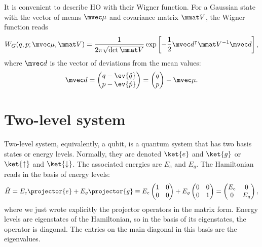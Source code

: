 \documentclass[fontsize=9pt,bookmarkpackage=false]{scrartcl}
\begin{document}
It is convenient to describe HO with their Wigner function.
For a Gaussian state with the vector of means $\mvec \mu$ and covariance matrix $\mmat V$, the Wigner function reads
\begin{equation}
  W_G ( q , p ; \mvec \mu, \mmat V )
  =
  \frac{ 1 }{ 2 \pi \sqrt{ \det \mmat V }}
  \exp\left[
    - \frac 12 \mvec d^\intercal \mmat V^{-1}  \mvec d
  \right],
\end{equation}
where $\mvec d$ is the vector of deviations from the mean values:
\begin{equation}
  \mvec d
  =
  \begin{pmatrix}
    q - \ev{ \hat q } \\ p - \ev{ \hat p }
  \end{pmatrix}
  =
  \begin{pmatrix}
    q \\ p
  \end{pmatrix}- \mvec \mu.
\end{equation}

\section{Two-level system} %
\label{sec:two_level_system}

Two-level system, equivalently, a qubit, is a quantum system that has two basis states or energy levels.
Normally, they are denoted $\ket{e}$ and $\ket{g}$ or $\ket{\uparrow}$ and $\ket{\downarrow}$.
The associated energies are $E_e$ and $E_g$.
The Hamiltonian reads in the basis of energy levels:
\begin{equation}
  \hat H = E_e \projector{e} + E_g \projector{g}
  \equiv
  E_e
  \begin{pmatrix}
    1 & 0 \\ 0 & 0
  \end{pmatrix}
  +
  E_g
  \begin{pmatrix}
    0 & 0 \\ 0 & 1
  \end{pmatrix}
  =
  \begin{pmatrix}
    E_e & 0 \\ 0 & E_g
  \end{pmatrix}
  ,
\end{equation}
where we just wrote explicitly the projector operators in the matrix form.
Energy levels are eigenstates of the Hamiltonian, so in the basis of its eigenstates, the operator is diagonal.
The entries on the main diagonal in this basis are the eigenvalues.
\end{document}
